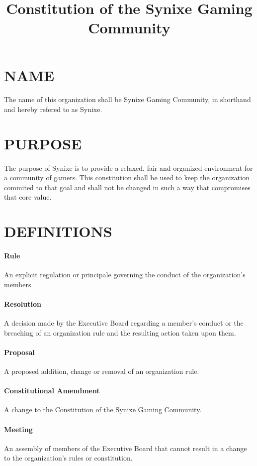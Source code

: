 \documentclass[10pt,a4paper]{article}
\title{Constitution of the Synixe Gaming Community}
\begin{document}
\maketitle
\newpage
\section{NAME}
\paragraph{}
The name of this organization shall be Synixe Gaming Community, in shorthand and hereby refered to as Synixe.
\section{PURPOSE}
\paragraph{}
The purpose of Synixe is to provide a relaxed, fair and organized environment for a community of gamers. This constitution shall be used to keep the organization commited to that goal and shall not be changed in such a way that compromises that core value.
\section{DEFINITIONS}
\paragraph{Rule} An explicit regulation or principale governing the conduct of the organization's members.
\paragraph{Resolution} A decision made by the Executive Board regarding a member's conduct or the breaching of an organization rule and the resulting action taken upon them.
\paragraph{Proposal} A proposed addition, change or removal of an organization rule.
\paragraph{Constitutional Amendment} A change to the Constitution of the Synixe Gaming Community.
\paragraph{Meeting} An assembly of members of the Executive Board that cannot result in a change to the organization's rules or constitution.
\end{document}
